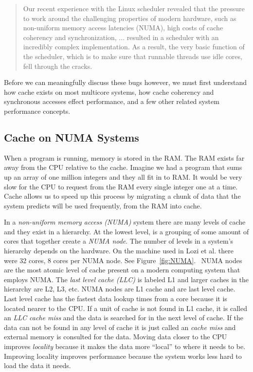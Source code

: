 \documentclass{sig-alternate}
\begin{document}
\begin{quote}
Our recent experience with the Linux scheduler revealed that the pressure to work around the challenging properties of modern hardware, such as non-uniform memory access latencies (NUMA), high costs of cache coherency and synchronization, ... resulted in a scheduler with an incredibly complex implementation. As a result, the very basic function of the scheduler, which is to make sure that runnable threads use idle cores, fell through the cracks.~\cite{Lozi:2016}
\end{quote}

Before we can meaningfully discuss these bugs however, we must first understand how cache exists on most multicore systems, how cache coherency and synchronous accesses effect performance, and a few other related system performance concepts.

\subsection{Cache on NUMA Systems}
\label{sec:cache}

When a program is running, memory is stored in the RAM. The RAM exists far away from the CPU relative to the cache. Imagine we had a program that sums up an array of one million integers and they all fit in to RAM. It would be very slow for the CPU to request from the RAM every single integer one at a time. Cache allows us to speed up this process by migrating a chunk of data that the system predicts will be used frequently, from the RAM into cache.

In a \emph{non-uniform memory access (NUMA)} system there are many levels of cache and they exist in a hierarchy. At the lowest level, is a grouping of some amount of cores that together create a \emph{NUMA node}. The number of levels in a system's hierarchy depends on the hardware. On the machine used in Lozi et al. there were 32 cores, 8 cores per NUMA node. See Figure~\ref{fig:NUMA}.~\cite{Lozi:2016} NUMA nodes are the most atomic level of cache present on a modern computing system that employs NUMA. The \emph{last level cache (LLC)} is labeled L1 and larger caches in the hierarchy are L2, L3, etc. NUMA nodes are L1 cache and are last level cache. Last level cache has the fastest data lookup times from a core because it is located nearer to the CPU. If a unit of cache is not found in L1 cache, it is called an \emph{LLC cache miss} and the data is searched for in the next level of cache. If the data can not be found in any level of cache it is just called an \emph{cache miss} and external memory is consulted for the data. Moving data closer to the CPU improves \emph{locality} because it makes the data more ``local'' to where it needs to be. Improving locality improves performance because the system works less hard to load the data it needs.~\cite{WikiCache}
\end{document}
